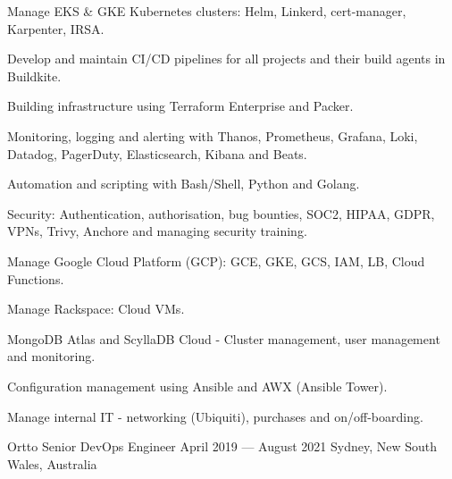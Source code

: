 \begin{cventries}
{\begin{cvitems}
      \item {Manage EKS \& GKE Kubernetes clusters: Helm, Linkerd, cert-manager, Karpenter, IRSA.}
      \item {Develop and maintain CI/CD pipelines for all projects and their build agents in Buildkite.}
      \item {Building infrastructure using Terraform Enterprise and Packer.}
      \item {Monitoring, logging and alerting with Thanos, Prometheus, Grafana, Loki, Datadog, PagerDuty, Elasticsearch, Kibana and Beats.}
      \item {Automation and scripting with Bash/Shell, Python and Golang.}
      \item {Security: Authentication, authorisation, bug bounties, SOC2, HIPAA, GDPR, VPNs, Trivy, Anchore and managing security training.}
      \item {Manage Google Cloud Platform (GCP): GCE, GKE, GCS, IAM, LB, Cloud Functions.}
      \item {Manage Rackspace: Cloud VMs.}
      \item {MongoDB Atlas and ScyllaDB Cloud - Cluster management, user management and monitoring.}
      \item {Configuration management using Ansible and AWX (Ansible Tower).}
      \item {Manage internal IT - networking (Ubiquiti), purchases and on/off-boarding.}
    \end{cvitems}
  }

  \cventry
  {Ortto} %
  {Senior DevOps Engineer} %
  {April 2019 --- August 2021} %
  {Sydney, New South Wales, Australia} %
  {} %
  {} %
  {} %


\end{cventries}

